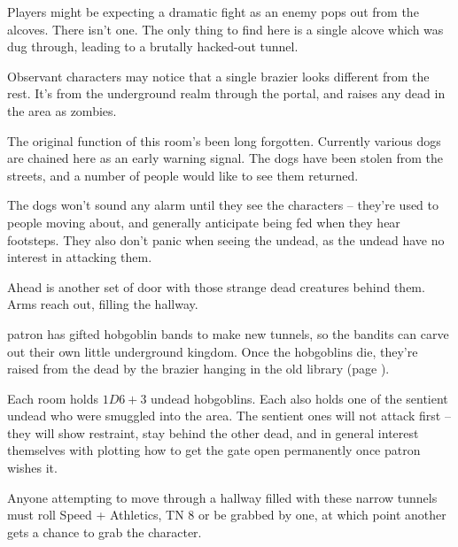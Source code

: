 Players might be expecting a dramatic fight as an enemy pops out from the alcoves.  There isn't one.  The only thing to find here is a single alcove which was dug through, leading to a brutally hacked-out tunnel.

Observant characters may notice that a single brazier looks different from the rest.  It's from the underground realm through the portal, and raises any dead in the area as zombies.

The original function of this room's been long forgotten.  Currently various dogs are chained here as an early warning signal.  The dogs have been stolen from the streets, and a number of people would like to see them returned.

The dogs won't sound any alarm until they see the characters -- they're used to people moving about, and generally anticipate being fed when they hear footsteps.  They also don't panic when seeing the undead, as the undead have no interest in attacking them.



\begin{boxtext}
	Ahead is another set of door with those strange dead creatures behind them.  Arms reach out, filling the hallway.
\end{boxtext}

\Gls{patron} has gifted hobgoblin bands to make new tunnels, so the bandits can carve out their own little underground kingdom.  Once the hobgoblins die, they're raised from the dead by the brazier hanging in the old library (page \pageref{oldlibrary}).

Each room holds $1D6+3$ undead hobgoblins.  Each also holds one of the sentient undead who were smuggled into the area.  The sentient ones will not attack first -- they will show restraint, stay behind the other dead, and in general interest themselves with plotting how to get the gate open permanently once \gls{patron} wishes it.

\zombiehobgoblin

Anyone attempting to move through a hallway filled with these narrow tunnels must roll Speed + Athletics, TN 8 or be grabbed by one, at which point another gets a chance to grab the character.





